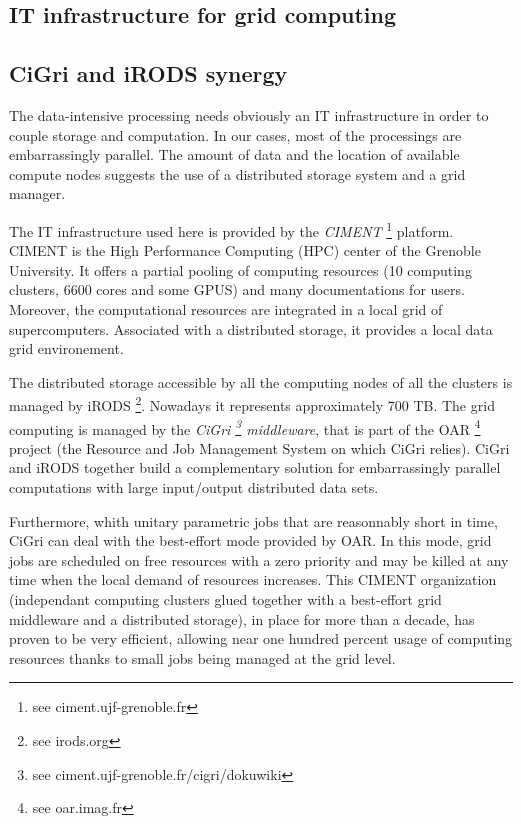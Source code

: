 \documentclass[a4paper, 10pt]{article}
\begin{document}
\begin{multicols}{2}



\section{IT infrastructure for grid computing}%


\subsection{CiGri and iRODS synergy}

The data-intensive processing
needs obviously an IT infrastructure in order to couple storage and computation.
In our cases, most of the processings are embarrassingly parallel.
The amount of data and the location of available compute nodes suggests the use of a 
distributed storage system and a grid manager.


The IT infrastructure used here is provided by the \emph{CIMENT} \footnote{see ciment.ujf-grenoble.fr} 
platform. CIMENT is the High Performance Computing (HPC) center of the Grenoble University. It offers a partial pooling of computing 
resources (10 computing clusters, 6600 cores and some GPUS) and many documentations for users. 
Moreover, the computational resources are integrated in a local grid of supercomputers. Associated with a distributed storage,
it provides a local data grid environement.

The distributed storage accessible by all the computing nodes of all the clusters is managed by iRODS \footnote{see irods.org}.
Nowadays it represents approximately 700 TB. The grid computing is managed by the \emph{CiGri 
\footnote{see ciment.ujf-grenoble.fr/cigri/dokuwiki} middleware}, that is part of the OAR \footnote{see oar.imag.fr} \cite{key:CDGHMMNR, key:CHR2009} project (the Resource and Job Management System on which CiGri relies). CiGri and iRODS together build a complementary solution for embarrassingly parallel computations with large input/output distributed data sets.

Furthermore, whith unitary parametric jobs that are reasonnably short in time, CiGri can deal with the best-effort mode provided by OAR. In this mode, grid jobs are scheduled on free resources with a zero priority and may be killed at any time when the local demand of resources increases. This CIMENT organization (independant computing clusters glued together with a best-effort grid middleware and a distributed storage), in place for more than a decade, has proven to be very efficient, allowing near one hundred percent usage of computing resources thanks to small jobs being managed at the grid level.


\end{multicols}
\end{document}

